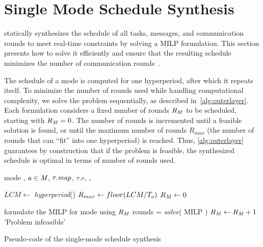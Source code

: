 
\section{Single Mode Schedule Synthesis}
\label{sec:single_mode}
\TTW statically synthesizes the schedule of all tasks, messages, and communication rounds to meet real-time constraints by solving a MILP formulation.
This section presents how to solve it efficiently and ensure that the resulting schedule minimizes the number of communication rounds~.

The schedule of a mode \modeany is computed for one hyperperiod, after which it repeats itself.
To minimize the number of rounds used while handling computational complexity, we solve the problem sequentially, as described in~\cref{alg:outerlayer}.
Each formulation considers a fixed number of rounds $R_{\mathit{M_{}}}$ to be scheduled, starting with $R_{\mathit{M_{}}}=0$. The number of rounds is incremented until a feasible solution is found, or until the maximum number of rounds $R_{max}$ (the number of rounds that can ``fit'' into one hyperperiod) is reached.
Thus, \cref{alg:outerlayer} guarantees by construction that if the problem is feasible, the synthesized schedule is optimal in terms of number of rounds used.

\begin{algorithm}
\begin{algorithmic}
\smaller
\Require
	mode \mode{},\;
	$\mathit{a_{}} \in \mathit{M_{}}$,\;
	$\tau.\mathit{map}$,\;
	$\tau.e$, \;
	\nslotsmax, \;
	\Toffset
\Ensure

\State $LCM \gets$ \textit{hyperperiod}(\mode{})
\State $R_{max} \gets floor(LCM/T_{o})$
\State $R_{\mathit{M_{}}} \gets 0$

	\State formulate the MILP for mode \mode{} using $R_{\mathit{M_{}}}$ rounds
	 = \textit{solve}( MILP )
		\Return {}
	\EndIf
	\State $R_{\mathit{M_{}}} \gets R_{\mathit{M_{}}}+1$
\EndWhile
\State \Return 'Problem infeasible'
\end{algorithmic}
\caption{\small Pseudo-code of the single-mode schedule synthesis}
\label{alg:outerlayer}
\end{algorithm}

